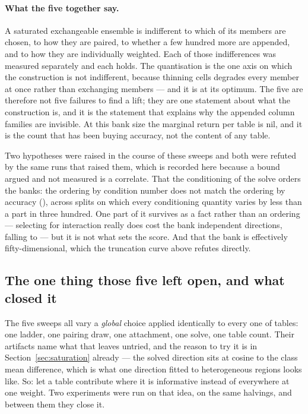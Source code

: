 \documentclass[11pt]{article}
\begin{document}
\paragraph{What the five together say.} A saturated exchangeable ensemble is
indifferent to which of its members are chosen, to how they are paired, to whether
a few hundred more are appended, and to how they are individually weighted. Each
of those indifferences was measured separately and each holds. The quantisation is
the one axis on which the construction is not indifferent, because thinning cells
degrades every member at once rather than exchanging members --- and it is at its
optimum. The five are therefore not five failures to find a lift; they are one
statement about what the construction is, and it is the statement that explains
why the appended column families are invisible. At this bank size the marginal
return per table is nil, and it is the count that has been buying accuracy, not
the content of any table.

Two hypotheses were raised in the course of these sweeps and both were refuted by
the same runs that raised them, which is recorded here because a bound argued and
not measured is a correlate. That the conditioning of the solve orders the banks:
the ordering by condition number does not match the ordering by accuracy
(\GramAgrees{}), across \GramSplits{} splits on which every conditioning quantity
varies by less than a part in three hundred. One part of it survives as a fact
rather than an ordering --- selecting for interaction really does cost the bank
independent directions, \GramEffRank{} falling to \GramEffRankSelected{} --- but it
is not what sets the score. And that the bank is effectively fifty-dimensional,
which the truncation curve above refutes directly.

\subsection{The one thing those five left open, and what closed it}
\label{sec:regional}
The five sweeps all vary a \emph{global} choice applied identically to every one
of \CompTablesFull{} tables: one ladder, one pairing draw, one attachment, one
solve, one table count. Their artifacts name what that leaves untried, and the
reason to try it is in Section~\ref{sec:saturation} already --- the solved
direction sits at cosine \GramCos{} to the class mean difference, which is what
one direction fitted to heterogeneous regions looks like. So: let a table
contribute where it is informative instead of everywhere at one weight. Two
experiments were run on that idea, on the same \LadderSplits{} halvings, and
between them they close it.
\end{document}
